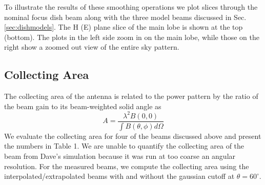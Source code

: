 \documentclass{emulateapj}
\begin{document}


To illustrate the results of these smoothing operations we plot slices through the nominal focus dish beam along with the three model beams discussed in Sec. \ref{sec:dishmodels}. The H (E) plane slice of the main lobe is shown at the top (bottom). The plots in the left side zoom in on the main lobe, while those on the right show a zoomed out view of the entire sky pattern. 

\subsection{Collecting Area}

The collecting area of the antenna is related to the power pattern by the ratio of the beam gain to its beam-weighted solid angle as
\begin{equation}
	A=\frac{\lambda^2 B(0,0)}{\int B(\theta,\phi)d\Omega}
\end{equation}
We evaluate the collecting area for four of the beams discussed above and present the numbers in Table 1. We are unable to quantify the collecting area of the beam from Dave's simulation because it was run at too coarse an angular resolution. For the measured beams, we compute the collecting area using the interpolated/extrapolated beams with and without the gaussian cutoff at $\theta=60^\circ$.
\end{document}

